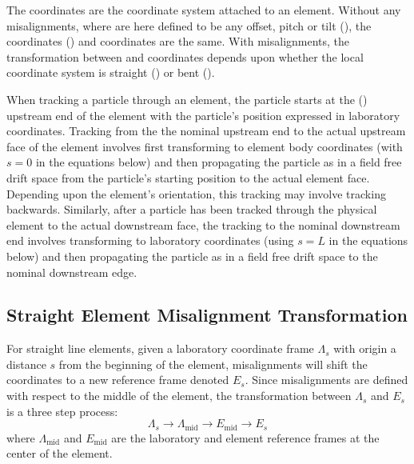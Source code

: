 The  coordinates are the coordinate system attached to an element. Without any
misalignments, where  are here defined to be any offset, pitch or tilt
(), the  coordinates () and  coordinates
are the same. With misalignments, the transformation between  and 
coordinates depends upon whether the local coordinate system is straight () or
bent ().

When tracking a particle through an element, the particle starts at the 
() upstream end of the element with the particle's position expressed in laboratory
coordinates. Tracking from the the nominal upstream end to the actual upstream face of the element
involves first transforming to element body coordinates (with $s = 0$ in the equations below) and
then propagating the particle as in a field free drift space from the particle's starting position
to the actual element face. Depending upon the element's orientation, this tracking may involve
tracking backwards. Similarly, after a particle has been tracked through the physical element to the
actual downstream face, the tracking to the nominal downstream end involves transforming to
laboratory coordinates (using $s = L$ in the equations below) and then propagating the particle as
in a field free drift space to the nominal downstream edge.

\subsection{Straight Element Misalignment Transformation}
\label{s:straight.mis}

For straight line elements, given a laboratory coordinate frame $\Lambda_s$ with origin a distance
$s$ from the beginning of the element, misalignments will shift the coordinates to a new reference
frame denoted $E_s$. Since misalignments are defined with respect to the middle of the element, the
transformation between $\Lambda_s$ and $E_s$ is a three step process:
\begin{equation}
  \Lambda_s \longrightarrow \Lambda_\text{mid} 
  \longrightarrow E_\text{mid} \longrightarrow E_s
  \label{llee}
\end{equation}
where $\Lambda_\text{mid}$ and $E_\text{mid}$ are the laboratory and element reference frames at the
center of the element.

